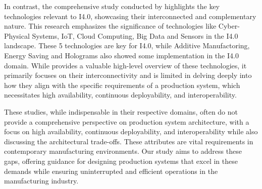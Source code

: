 In contrast, the comprehensive study conducted by \cite{Kang2016-nq} highlights the key technologies relevant to I4.0, showcasing their interconnected and complementary nature. This research emphasizes the significance of technologies like Cyber-Physical Systems, IoT, Cloud Computing, Big Data and Sensors in the I4.0 landscape. These 5 technologies are key for I4.0, while Additive Manufactoring, Energy Saving and Holograms also showed some implementation in the I4.0 domain. While \cite{Kang2016-nq} provides a valuable high-level overview of these technologies, it primarily focuses on their interconnectivity and is limited in delving deeply into how they align with the specific requirements of a production system, which necessitates high availability, continuous deployability, and interoperability.

These studies, while indispensable in their respective domains, often do not provide a comprehensive perspective on production system architecture, with a focus on high availability, continuous deployability, and interoperability while also discussing the architectural trade-offs. These attributes are vital requirements in contemporary manufacturing environments. Our study aims to address these gaps, offering guidance for designing production systems that excel in these demands while ensuring uninterrupted and efficient operations in the manufacturing industry.